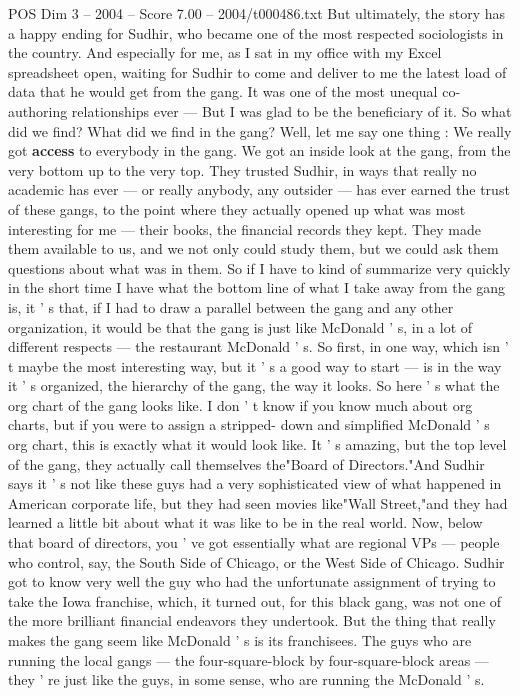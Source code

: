 \begin{textsample}{POS Dim 3 – 2004 – Score 7.00 – 2004/t000486.txt}
But ultimately, the story has a happy ending for Sudhir, who became one of the most respected sociologists in the country.
And especially for me, as I sat in my office with my Excel spreadsheet open, waiting for Sudhir to come and deliver to me the latest load of data that he would get from the gang.
It was one of the most unequal co-authoring relationships ever — But I was glad to be the beneficiary of it.
So what did we find?
What did we find in the gang?
Well, let me say one thing : We really got \textbf{access} to everybody in the gang.
We got an inside look at the gang, from the very bottom up to the very top.
They trusted Sudhir, in ways that really no academic has ever — or really anybody, any outsider — has ever earned the trust of these gangs, to the point where they actually opened up what was most interesting for me — their books, the financial records they kept.
They made them available to us, and we not only could study them, but we could ask them questions about what was in them.
So if I have to kind of summarize very quickly in the short time I have what the bottom line of what I take away from the gang is, it ' s that, if I had to draw a parallel between the gang and any other organization, it would be that the gang is just like McDonald ' s, in a lot of different respects — the restaurant McDonald ' s.
So first, in one way, which isn ' t maybe the most interesting way, but it ' s a good way to start — is in the way it ' s organized, the hierarchy of the gang, the way it looks.
So here ' s what the org chart of the gang looks like.
I don ' t know if you know much about org charts, but if you were to assign a stripped- down and simplified McDonald ' s org chart, this is exactly what it would look like.
It ' s amazing, but the top level of the gang, they actually call themselves the"Board of Directors."And Sudhir says it ' s not like these guys had a very sophisticated view of what happened in American corporate life, but they had seen movies like"Wall Street,"and they had learned a little bit about what it was like to be in the real world.
Now, below that board of directors, you ' ve got essentially what are regional VPs — people who control, say, the South Side of Chicago, or the West Side of Chicago.
Sudhir got to know very well the guy who had the unfortunate assignment of trying to take the Iowa franchise, which, it turned out, for this black gang, was not one of the more brilliant financial endeavors they undertook.
But the thing that really makes the gang seem like McDonald ' s is its franchisees.
The guys who are running the local gangs — the four-square-block by four-square-block areas — they ' re just like the guys, in some sense, who are running the McDonald ' s.

\end{textsample}
